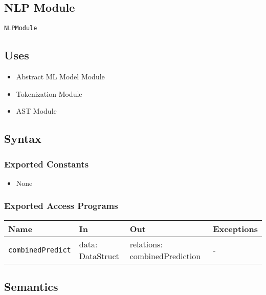 \documentclass[12pt, titlepage]{article}
\begin{document}

\subsection{NLP Module}  \label{NLPModule}

\texttt{NLPModule}

\subsection{Uses}

\begin{itemize}
    \item Abstract ML Model Module
    \item Tokenization Module
    \item AST Module
\end{itemize}

\subsection{Syntax}

\subsubsection{Exported Constants}

\begin{itemize}
    \item None
\end{itemize}

\subsubsection{Exported Access Programs}

\begin{center}
\begin{tabular}{p{5cm} p{3.5cm} p{3.5cm} p{2cm}}
\hline
\textbf{Name} & \textbf{In} & \textbf{Out} & \textbf{Exceptions} \\
\hline
\texttt{combinedPredict} & data: DataStruct & relations: combinedPrediction & -\\
\hline
\end{tabular}
\end{center}

\subsection{Semantics}
\end{document}
